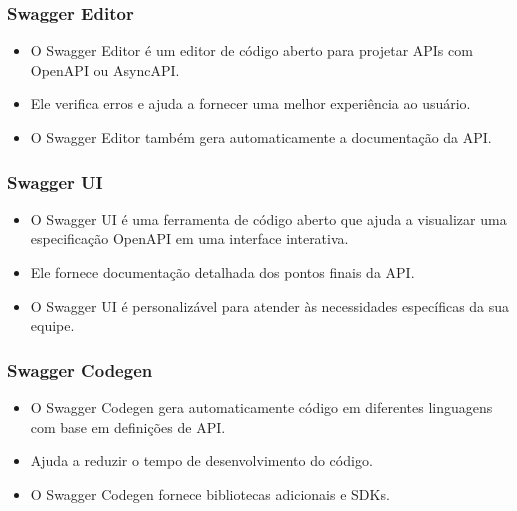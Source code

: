 \documentclass{beamer}
\begin{document}
\begin{frame}
  \frametitle{Swagger Editor} 
  
  
  \begin{itemize}
  \item O Swagger Editor é um editor de código aberto para projetar APIs com OpenAPI ou AsyncAPI.
  \item Ele verifica erros e ajuda a fornecer uma melhor experiência ao usuário.
  \item O Swagger Editor também gera automaticamente a documentação da API.
  \end{itemize}
  
  \end{frame}



  \begin{frame}
    \frametitle{Swagger UI}
    
    
    \begin{itemize}
    \item O Swagger UI é uma ferramenta de código aberto que ajuda a visualizar uma especificação OpenAPI em uma interface interativa.
    \item Ele fornece documentação detalhada dos pontos finais da API.
    \item O Swagger UI é personalizável para atender às necessidades específicas da sua equipe.
    \end{itemize}
    
    \end{frame}


\begin{frame}
\frametitle{Swagger Codegen}


\begin{itemize}
\item O Swagger Codegen gera automaticamente código em diferentes linguagens com base em definições de API.
\item Ajuda a reduzir o tempo de desenvolvimento do código.
\item O Swagger Codegen fornece bibliotecas adicionais e SDKs.
\end{itemize}
\end{frame}
\end{document}
